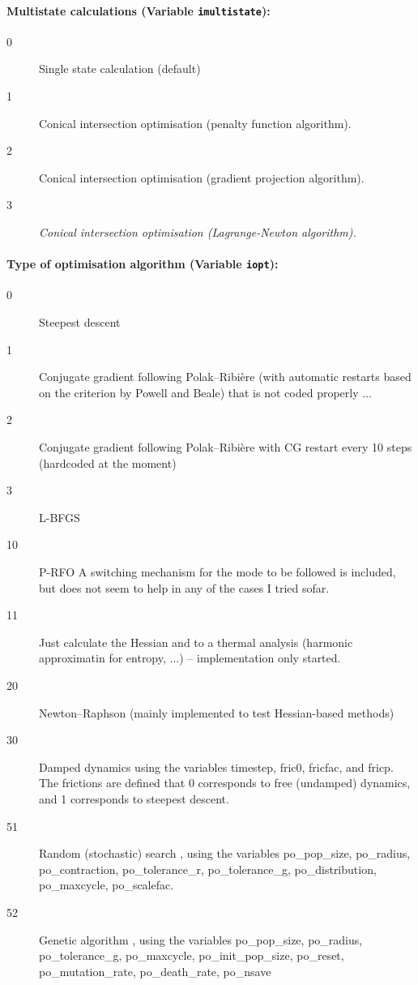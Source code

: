 \documentclass{article}
\begin{document}
\paragraph{Multistate calculations (Variable \texttt{imultistate}):}
\begin{description}
\item[0] Single state calculation (default)
\item[1] Conical intersection optimisation (penalty function algorithm).
\item[2] Conical intersection optimisation (gradient projection algorithm).
\item[3] \emph{Conical intersection optimisation (Lagrange-Newton algorithm).}
\end{description}

\paragraph{Type of optimisation algorithm (Variable \texttt{iopt}):}
\begin{description}
\item[0] Steepest descent
\item[1] Conjugate gradient following Polak--Ribi\`ere \cite{pol69} (with automatic
  restarts based on the criterion by Powell and Beale) that is not coded
  properly ...
\item[2] Conjugate gradient following Polak--Ribi\`ere \cite{pol69} with CG
  restart every 10 steps (hardcoded at the moment)
\item[3] L-BFGS \cite{liu89,noc80}
\item[10] P-RFO \cite{cer81,sim83,ban85,bak86} A switching mechanism for the
  mode to be followed is included, but does not seem to help in any of the
  cases I tried sofar.
\item[11] Just calculate the Hessian and to a thermal analysis (harmonic
  approximatin for entropy, ...) -- implementation only started.
\item[20] Newton--Raphson (mainly implemented to test Hessian-based methods)
\item[30] Damped dynamics using the variables timestep, fric0, fricfac, and
  fricp. The frictions are defined that 0 corresponds to free (undamped)
  dynamics, and 1 corresponds to steepest descent.
\item[51] Random (stochastic) search \cite{brooks57,luusj73}, using the variables po\_pop\_size, po\_radius,
            po\_contraction, po\_tolerance\_r, po\_tolerance\_g, 
            po\_distribution, po\_maxcycle, po\_scalefac.
\item[52] Genetic algorithm \cite{holland75,goldberg89,haupth98}, using the variables po\_pop\_size, po\_radius,
            po\_tolerance\_g, po\_maxcycle, po\_init\_pop\_size, po\_reset, 
            po\_mutation\_rate, po\_death\_rate, po\_nsave
\end{description}
\end{document}
